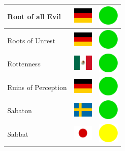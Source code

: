 \documentclass[12pt, a4paper, twoside]{report}
\begin{document}
\begin{center}
\begin{longtable}{|p{5cm}|p{2cm}|p{2cm}|}
 Root of all Evil                                           & \includegraphics[width=1cm]{../4x3/de} &   \includegraphics[width=1cm]{../likes/y} \\ \hline
 Roots of Unrest                                            & \includegraphics[width=1cm]{../4x3/de} &   \includegraphics[width=1cm]{../likes/y} \\ \hline
 Rottenness                                                 & \includegraphics[width=1cm]{../4x3/mx} &   \includegraphics[width=1cm]{../likes/y} \\ \hline
 Ruins of Perception                                        & \includegraphics[width=1cm]{../4x3/de} &   \includegraphics[width=1cm]{../likes/y} \\ \hline
 Sabaton                                                    & \includegraphics[width=1cm]{../4x3/se} &   \includegraphics[width=1cm]{../likes/y} \\ \hline
 Sabbat                                                     & \includegraphics[width=1cm]{../4x3/jp} &   \includegraphics[width=1cm]{../likes/m} \\ \hline

\end{longtable}
\end{center}
\end{document}
